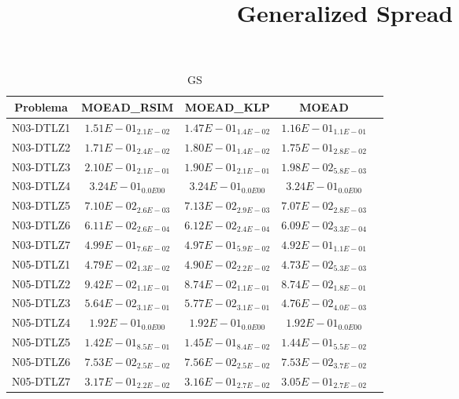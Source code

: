 \documentclass{article}
\title{Generalized Spread}
\author{}
\begin{document}
\maketitle
\begin{table*}[ht!]
\scriptsize
\caption{GS}
\centering\begin{tabular}{|c||c||c||c||c|} \hline
Problema &MOEAD_RSIM &MOEAD_KLP &MOEAD\\\hline
N03-DTLZ1 &$1.51E-01_{2.1E-02}$ &\cellcolor{gray25}$1.47E-01_{1.4E-02}$ &\cellcolor{gray95}$1.16E-01_{1.1E-01}$\\ 
\hline
N03-DTLZ2 &\cellcolor{gray95}$1.71E-01_{2.4E-02}$ &$1.80E-01_{1.4E-02}$ &\cellcolor{gray25}$1.75E-01_{2.8E-02}$\\ 
\hline
N03-DTLZ3 &$2.10E-01_{2.1E-01}$ &\cellcolor{gray25}$1.90E-01_{2.1E-01}$ &\cellcolor{gray95}$1.98E-02_{5.8E-03}$\\ 
\hline
N03-DTLZ4 &\cellcolor{gray95}$3.24E-01_{0.0E00}$ &\cellcolor{gray25}$3.24E-01_{0.0E00}$ &$3.24E-01_{0.0E00}$\\ 
\hline
N03-DTLZ5 &\cellcolor{gray25}$7.10E-02_{2.6E-03}$ &$7.13E-02_{2.9E-03}$ &\cellcolor{gray95}$7.07E-02_{2.8E-03}$\\ 
\hline
N03-DTLZ6 &\cellcolor{gray25}$6.11E-02_{2.6E-04}$ &$6.12E-02_{2.4E-04}$ &\cellcolor{gray95}$6.09E-02_{3.3E-04}$\\ 
\hline
N03-DTLZ7 &$4.99E-01_{7.6E-02}$ &\cellcolor{gray25}$4.97E-01_{5.9E-02}$ &\cellcolor{gray95}$4.92E-01_{1.1E-01}$\\ 
\hline
N05-DTLZ1 &\cellcolor{gray25}$4.79E-02_{1.3E-02}$ &$4.90E-02_{2.2E-02}$ &\cellcolor{gray95}$4.73E-02_{5.3E-03}$\\ 
\hline
N05-DTLZ2 &$9.42E-02_{1.1E-01}$ &\cellcolor{gray25}$8.74E-02_{1.1E-01}$ &\cellcolor{gray95}$8.74E-02_{1.8E-01}$\\ 
\hline
N05-DTLZ3 &\cellcolor{gray25}$5.64E-02_{3.1E-01}$ &$5.77E-02_{3.1E-01}$ &\cellcolor{gray95}$4.76E-02_{4.0E-03}$\\ 
\hline
N05-DTLZ4 &\cellcolor{gray95}$1.92E-01_{0.0E00}$ &\cellcolor{gray25}$1.92E-01_{0.0E00}$ &$1.92E-01_{0.0E00}$\\ 
\hline
N05-DTLZ5 &\cellcolor{gray95}$1.42E-01_{8.5E-01}$ &$1.45E-01_{8.4E-02}$ &\cellcolor{gray25}$1.44E-01_{5.5E-02}$\\ 
\hline
N05-DTLZ6 &\cellcolor{gray25}$7.53E-02_{2.5E-02}$ &$7.56E-02_{2.5E-02}$ &\cellcolor{gray95}$7.53E-02_{3.7E-02}$\\ 
\hline
N05-DTLZ7 &$3.17E-01_{2.2E-02}$ &\cellcolor{gray25}$3.16E-01_{2.7E-02}$ &\cellcolor{gray95}$3.05E-01_{2.7E-02}$\\ 

\end{tabular}
\end{table*}
\end{document}
